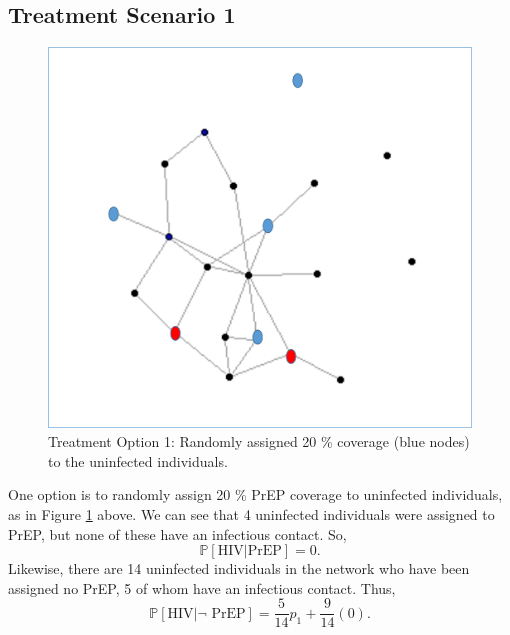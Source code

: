 \documentclass{article}
\theoremstyle{definition}
\begin{document}
\subsection{Treatment Scenario 1} 
\begin{figure}[H]
    \centering
    \includegraphics[scale=0.5]{Figures/Network Example 3.png}
    \caption{Treatment Option 1: Randomly assigned 20 \% coverage (blue nodes) to the uninfected individuals.}
    \label{fig:Figure 4}
\end{figure}

One option is to randomly assign 20 \% PrEP coverage to uninfected individuals, as in Figure \ref{fig:Figure 4} above.
We can see that 4 uninfected individuals were assigned to PrEP, but none of these have an infectious contact. So, $$\mathbb{P}\left[\text{HIV}\vert \text{PrEP} \right]=0.$$ Likewise, there are 14 uninfected individuals in the network who have been assigned no PrEP, 5 of whom have an infectious contact. Thus, $$\mathbb{P}\left[\text{HIV} \vert \neg \text{ PrEP}\right]=\frac{5}{14}p_{1}+\frac{9}{14}\left(0\right).$$  
\end{document}

